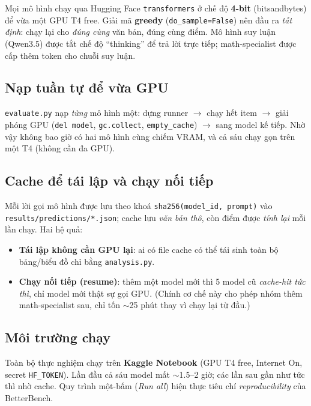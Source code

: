 Mọi mô hình chạy qua Hugging Face \texttt{transformers} ở chế độ \textbf{4-bit}
(bitsandbytes) để vừa một GPU T4 free. Giải mã \textbf{greedy}
(\texttt{do\_sample=False}) nên đầu ra \emph{tất định}: chạy lại cho \emph{đúng cùng}
văn bản, đúng cùng điểm. Mô hình suy luận (Qwen3.5) được tắt chế độ ``thinking'' để
trả lời trực tiếp; math-specialist được cấp thêm token cho chuỗi suy luận.

\subsection{Nạp tuần tự để vừa GPU}

\texttt{evaluate.py} nạp \emph{từng} mô hình một: dựng runner $\to$ chạy hết item
$\to$ giải phóng GPU (\texttt{del model}, \texttt{gc.collect}, \texttt{empty\_cache})
$\to$ sang model kế tiếp. Nhờ vậy không bao giờ có hai mô hình cùng chiếm VRAM, và
cả sáu chạy gọn trên một T4 (không cần đa GPU).

\subsection{Cache để tái lập và chạy nối tiếp}

Mỗi lời gọi mô hình được lưu theo khoá \texttt{sha256(model\_id, prompt)} vào
\texttt{results/predictions/*.json}; cache lưu \emph{văn bản thô}, còn điểm được
\emph{tính lại} mỗi lần chạy. Hai hệ quả:

\begin{itemize}
  \item \textbf{Tái lập không cần GPU lại}: ai có file cache có thể tái sinh toàn
    bộ bảng/biểu đồ chỉ bằng \texttt{analysis.py}.
  \item \textbf{Chạy nối tiếp (resume)}: thêm một model mới thì 5 model cũ
    \emph{cache-hit tức thì}, chỉ model mới thật sự gọi GPU. (Chính cơ chế này cho
    phép nhóm thêm math-specialist sau, chỉ tốn $\sim$25 phút thay vì chạy lại
    từ đầu.)
\end{itemize}

\subsection{Môi trường chạy}

Toàn bộ thực nghiệm chạy trên \textbf{Kaggle Notebook} (GPU T4 free, Internet On,
secret \texttt{HF\_TOKEN}). Lần đầu cả sáu model mất $\sim$1.5--2 giờ; các lần sau
gần như tức thì nhờ cache. Quy trình một-bấm (\emph{Run all}) hiện thực tiêu chí
\emph{reproducibility} của BetterBench.
